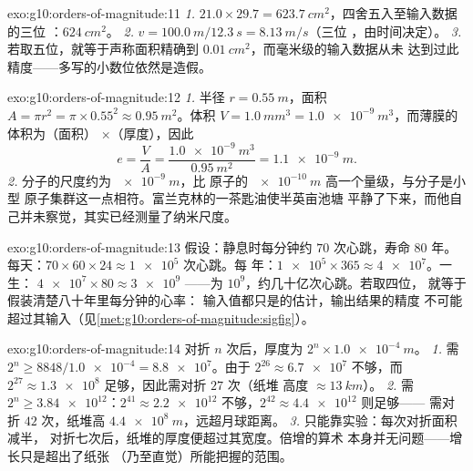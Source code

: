 \begin{solution}{exo:g10:orders-of-magnitude:11}
\emph{1.} $21.0 \times 29.7 = \qty{623.7}{cm^2}$，四舍五入至输入数据的三位
：$\qty{624}{cm^2}$。
\emph{2.} $v = \qty{100.0}{m}/\qty{12.3}{s} = \qty{8.13}{m/s}$（三位
，由时间决定）。
\emph{3.} 若取五位，就等于声称面积精确到
$\qty{0.01}{cm^2}$，而毫米级的输入数据从未
达到过此精度——多写的小数位依然是造假。
\end{solution}

\begin{solution}{exo:g10:orders-of-magnitude:12}
\emph{1.} 半径 $r = \qty{0.55}{m}$，面积
$A = \pi r^{2} = \pi \times 0.55^{2} \approx \qty{0.95}{m^2}$。体积
$V = \qty{1.0}{mm^3} = \qty{1.0e-9}{m^3}$，而薄膜的体积为（面积）
$\times$（厚度），因此
\[
e = \frac{V}{A} = \frac{\qty{1.0e-9}{m^3}}{\qty{0.95}{m^2}}
= \qty{1.1e-9}{m} .
\]
\emph{2.} 分子的尺度约为 $\qty{e-9}{m}$，比
原子的 $\qty{e-10}{m}$ 高一个量级，与分子是小型
原子集群这一点相符。富兰克林的一茶匙油使半英亩池塘
平静了下来，而他自己并未察觉，其实已经测量了纳米尺度。
\end{solution}

\begin{solution}{exo:g10:orders-of-magnitude:13}
假设：静息时每分钟约 $70$ 次心跳，寿命 $80$
年。每天：$70 \times 60 \times 24 \approx \num{1e5}$ 次心跳。每
年：$\num{1e5} \times 365 \approx \num{4e7}$。一生：
$\num{4e7} \times 80 \approx \num{3e9}$ ——为
$10^{9}$，约几十亿次心跳。若取四位，
就等于假装清楚八十年里每分钟的心率：
输入值都只是的估计，输出结果的精度
不可能超过其输入（见\cref{met:g10:orders-of-magnitude:sigfig}）。
\end{solution}

\begin{solution}{exo:g10:orders-of-magnitude:14}
对折 $n$ 次后，厚度为 $2^{n} \times \qty{1.0e-4}{m}$。
\emph{1.} 需 $2^{n} \geq 8848/\num{1.0e-4} = \num{8.8e7}$。由于
$2^{26} \approx \num{6.7e7}$ 不够，而
$2^{27} \approx \num{1.3e8}$ 足够，因此需对折 $27$ 次（纸堆
高度 $\approx \qty{13}{km}$）。
\emph{2.} 需 $2^{n} \geq \num{3.84e12}$：$2^{41} \approx
\num{2.2e12}$ 不够，$2^{42} \approx \num{4.4e12}$ 则足够——
需对折 $42$ 次，纸堆高 $\qty{4.4e8}{m}$，远超月球距离。
\emph{3.} 只能靠实验：每次对折面积减半，
对折七次后，纸堆的厚度便超过其宽度。倍增的算术
本身并无问题——增长只是超出了纸张
（乃至直觉）所能把握的范围。
\end{solution}

